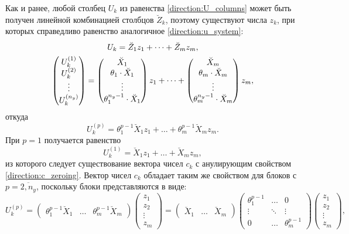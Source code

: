 Как и ранее, любой столбец $U_k$ из равенства \eqref{direction:U_columns} может быть получен линейной комбинацией столбцов $\breve{Z}_k$, поэтому
существуют числа $z_k$, при которых справедливо равенство аналогичное \eqref{direction:u_system}:
\begin{gather*}
    U_k = \breve{Z}_1 z_1 + \dots + \breve{Z}_m z_m , \notag \\
    \begin{pmatrix}
        U_k^{(1)} \\
        U_k^{(2)} \\
        \vdots    \\
        U_k^{(n_y)}
    \end{pmatrix}
    =
    \begin{pmatrix}
        \breve{X}_1                \\
        \theta_1 \cdot \breve{X}_1 \\
        \vdots                     \\
        \theta_1^{n_y-1} \cdot \breve{X}_1
    \end{pmatrix}
    z_1
    + \dots
    + \begin{pmatrix}
        \breve{X}_m                \\
        \theta_m \cdot \breve{X}_m \\
        \vdots                     \\
        \theta_m^{n_y-1} \cdot \breve{X}_m
    \end{pmatrix}
    z_m ,
\end{gather*}
откуда
\[
    U_k^{(p)}
    = \theta_1^{p-1} \breve{X}_1 z_1 + \dots + \theta_m^{p-1} \breve{X}_m z_m
    .
\]
При $p=1$ получается равенство
\[
    U_k^{(1)}
    = \breve{X}_1 z_1 + \dots + \breve{X}_m z_m
    ,
\]
из которого следует существование вектора чисел $c_k$ с анулирующим свойством \eqref{direction:c_zeroing}. Вектор чисел $c_k$ обладает таким же свойством
для блоков с $p=\overline{2,n_y}$, поскольку блоки представляются в виде:
\[
    U_k^{(p)}
    = \begin{pmatrix}
        \theta_1^{p-1} \breve{X}_1 & \dots & \theta_m^{p-1} \breve{X}_m
    \end{pmatrix}
    \begin{pmatrix}
        z_1    \\
        z_2    \\
        \vdots \\
        z_m
    \end{pmatrix}
    = \begin{pmatrix}
        \breve{X}_1 & \dots & \breve{X}_m
    \end{pmatrix}
    \begin{pmatrix}
        \theta_1^{p-1} & \dots  & 0              \\
        \vdots         & \ddots & \vdots         \\
        0              & \dots  & \theta_m^{p-1}
    \end{pmatrix}
    \begin{pmatrix}
        z_1    \\
        z_2    \\
        \vdots \\
        z_m
    \end{pmatrix}
    ,
\]
